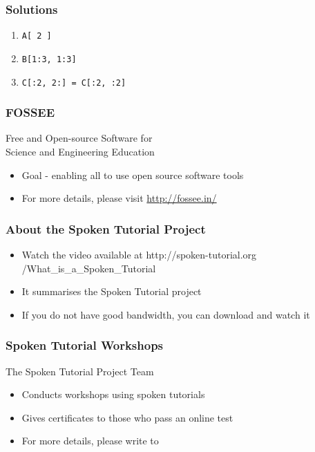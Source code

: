 \documentclass[17pt,compress]{beamer}
\begin{document}
\begin{frame}
\frametitle{Solutions}
\label{sec-15}
\begin{enumerate}
\item \texttt{A[ 2 ]}
\vspace{12pt}
\item \texttt{B[1:3, 1:3]}
\vspace{12pt}
\item \texttt{C[:2, 2:] = C[:2, :2]}
\end{enumerate}
\end{frame}
\begin{frame}
\frametitle{FOSSEE}
{\color{blue}Free and Open-source Software for \\Science and Engineering Education} \\
\begin{itemize}
\item Goal - enabling all to use open source software tools
\item For more details, please visit {\color{blue}\url{http://fossee.in/}}
\end{itemize}
\end{frame}
\begin{frame}
\frametitle{About the Spoken Tutorial Project}
\begin{itemize}
\item Watch the video available at {\color{blue}http://spoken-tutorial.org /What\_is\_a\_Spoken\_Tutorial}
\item It summarises the Spoken Tutorial project \pause
\item If you do not have good bandwidth, you can download and watch it
\end{itemize}
\end{frame}
\begin{frame}
\frametitle{Spoken Tutorial Workshops}The Spoken Tutorial Project Team 
\begin{itemize}
\item Conducts workshops using spoken tutorials 
\item Gives certificates to those who pass an online test 
\item For more details, please write to \\ 
\end{itemize}
\end{frame}
\end{document}
